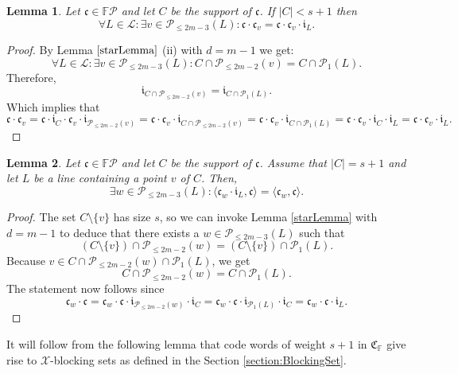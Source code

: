 \documentclass[12pt]{article}
\newcommand{\F}{\mathbb{F}}
\newcommand{\Points}{\mathcal{P}}
\newcommand{\Lines}{\mathcal{L}}
\newcommand{\FP}{\F\Points}
\newcommand{\Code}{\mathfrak{C}_\F}
\renewcommand{\i}{\mathfrak{i}}
\renewcommand{\c}{\mathfrak{c}}
\newcommand{\cv}{\mathfrak{c}_{v}}
\newtheorem{lemma}{Lemma}
\theoremstyle{remark}
\begin{document}
\begin{lemma}\label{smallc}
	Let \(\mathfrak{c}\in \FP\) and let \(C\) be the support of \(\c\).
	If \(|C|<s+1\) then
	\[\forall L \in \Lines:\exists v \in \Points_{\le2m-3}(L): \c\cdot\cv = \c\cdot\cv\cdot\i_L.\]
\end{lemma}
\begin{proof}
	By Lemma \(\ref{starLemma}\) (ii) with \(d=m-1\) we get:
	\[\forall L \in \Lines: \exists v \in \Points_{\le 2m-3}(L): C\cap \Points_{\le2m-2}(v) = C\cap \Points_{1}(L).\]
	Therefore, \[\i_{C\cap \Points_{\le2m-2}(v)}= \i_{C\cap \Points_{1}(L)}.\]
	Which implies that
	\[\c\cdot\cv = \c\cdot\i_C\cdot\cv\cdot\i_{\Points_{\le2m-2}(v)} = \c\cdot\c_v\cdot\i_{C\cap \Points_{\le2m-2}(v)}= \c\cdot\cv\cdot \i_{C\cap \Points_{1}(L)} = \c\cdot\cv\cdot\i_C\cdot \i_L = \c\cdot\cv\cdot\i_L.\]
\end{proof}

\begin{lemma}\label{alsoLines}
	Let \(\mathfrak{c}\in \FP\) and let \(C\) be the support of \(\c\). Assume that \(|C|=s+1\) and
	let \(L\) be a line containing a point \(v\) of \(C\). Then,  
	\[\exists w \in \Points_{\le 2m-3}(L): \langle \c_w\cdot \i_L ,\c\rangle = \langle \c_w,\c\rangle.\]
\end{lemma}
\begin{proof}
	The set $C\setminus\{v\}$ has size $s$, so we can invoke Lemma \ref{starLemma} with $d=m-1$ to deduce that there exists a \(w\in\Points_{\le 2m-3}(L)\) such that \[(C\setminus \{v\}) \cap \Points_{\le 2m-2}(w) = (C\setminus \{v\}) \cap \Points_{1}(L).\]
	Because \(v\in C\cap\Points_{\le 2m-2}(w)\cap\Points_{1}(L)\), we get
	\[C \cap \Points_{\le 2m-2}(w) = C \cap \Points_{1}(L).\]
	The statement now follows since
	\[\c_w\cdot\c = \c_w\cdot\c\cdot\i_{\Points_{\le 2m-2}(w)}\cdot\i_C = \c_w\cdot\c\cdot\i_{\Points_{1}(L)}\cdot\i_C = \c_w\cdot \c\cdot \i_L.\]
\end{proof}
It will follow from the following lemma that code words of weight $s+1$ in $\Code$ give rise to $\mathcal{X}$-blocking sets as defined in the Section \ref{section:BlockingSet}.
\end{document}
